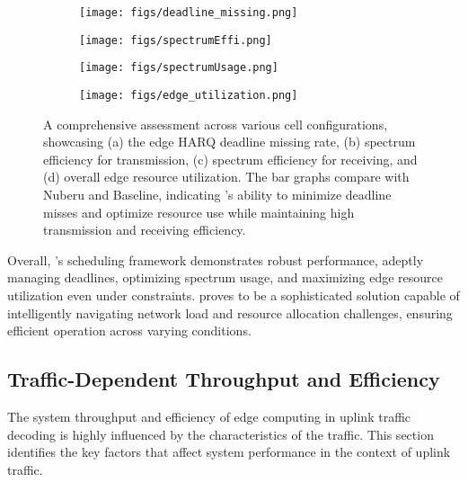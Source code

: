 \begin{figure*}
    \centering
    \begin{subfigure}[b]{0.45\textwidth} %
        \centering
        \texttt{[image: figs/deadline\_missing.png]}
        \caption{}
        \label{fig:edge_dead}
    \end{subfigure}
    \hfill
    \begin{subfigure}[b]{0.45\textwidth} %
        \centering
        \texttt{[image: figs/spectrumEffi.png]}
        \caption{}
        \label{fig:spt}
    \end{subfigure}
    \hfill
    \begin{subfigure}[b]{0.45\textwidth} %
        \centering
        \texttt{[image: figs/spectrumUsage.png]}
        \caption{}
        \label{fig:spr}
    \end{subfigure}
    \hfill
    \begin{subfigure}[b]{0.45\textwidth} %
        \centering
        \texttt{[image: figs/edge\_utilization.png]}
        \caption{}
        \label{fig:edge_utlization}
    \end{subfigure}
    \caption{A comprehensive assessment across various cell configurations, showcasing (a) the edge HARQ deadline missing rate, (b) spectrum efficiency for transmission, (c) spectrum efficiency for receiving, and (d) overall edge resource utilization. The bar graphs compare \Name{} with Nuberu and Baseline, indicating \Name{}'s ability to minimize deadline misses and optimize resource use while maintaining high transmission and receiving efficiency.}
    \label{fig:schedulingEvaluation}
\end{figure*}



Overall, \Name{}’s scheduling framework demonstrates robust performance, adeptly managing deadlines, optimizing spectrum usage, and maximizing edge resource utilization even under constraints. \Name{} proves to be a sophisticated solution capable of intelligently navigating network load and resource allocation challenges, ensuring efficient operation across varying conditions.



\subsection{Traffic-Dependent Throughput and Efficiency}
The system throughput and efficiency of edge computing in uplink traffic decoding is highly influenced by the characteristics of the traffic. This section identifies the key factors that affect system performance in the context of uplink traffic.


